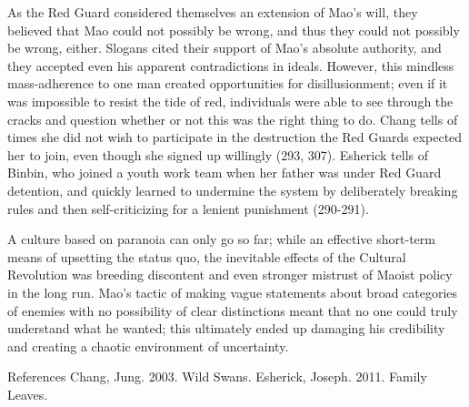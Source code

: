 As the Red Guard considered themselves an extension of
Mao's will, they believed that Mao could not possibly be
wrong, and thus they could not possibly be wrong,
either. Slogans cited their support of Mao's absolute
authority, and they accepted even his apparent
contradictions in ideals. However, this mindless
mass-adherence to one man created opportunities for
disillusionment; even if it was impossible to resist the
tide of red, individuals were able to see through the
cracks and question whether or not this was the right
thing to do. Chang tells of times she did not wish to
participate in the destruction the Red Guards expected
her to join, even though she signed up willingly (293,
307). Esherick tells of Binbin, who joined a youth work
team when her father was under Red Guard detention, and
quickly learned to undermine the system by deliberately
breaking rules and then self-criticizing for a lenient
punishment (290-291). 

A culture based on paranoia can only go so far;
while an effective short-term means of upsetting the
status quo, the inevitable effects of the Cultural
Revolution was breeding discontent and even stronger
mistrust of Maoist policy in the long run. Mao's
tactic of making vague statements about broad
categories of enemies with no possibility of clear
distinctions meant that no one could truly
understand what he wanted; this ultimately ended up
damaging his credibility and creating a chaotic
environment of uncertainty.

References
Chang, Jung. 2003. Wild Swans.
Esherick, Joseph. 2011. Family Leaves.

